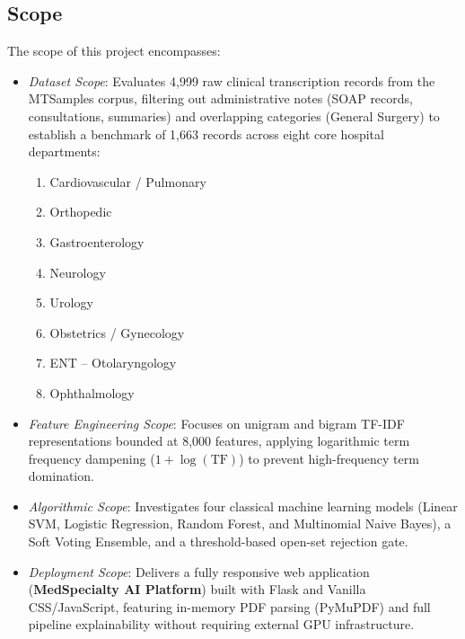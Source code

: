 \subsection{Scope}
The scope of this project encompasses:
\begin{itemize}
    \item \textit{Dataset Scope}: Evaluates 4,999 raw clinical transcription records from the MTSamples corpus, filtering out administrative notes (SOAP records, consultations, summaries) and overlapping categories (General Surgery) to establish a benchmark of 1,663 records across eight core hospital departments:
    \begin{enumerate}
        \item Cardiovascular / Pulmonary
        \item Orthopedic
        \item Gastroenterology
        \item Neurology
        \item Urology
        \item Obstetrics / Gynecology
        \item ENT -- Otolaryngology
        \item Ophthalmology
    \end{enumerate}
    \item \textit{Feature Engineering Scope}: Focuses on unigram and bigram TF-IDF representations bounded at 8,000 features, applying logarithmic term frequency dampening ($1 + \log(\text{TF})$) to prevent high-frequency term domination.
    \item \textit{Algorithmic Scope}: Investigates four classical machine learning models (Linear SVM, Logistic Regression, Random Forest, and Multinomial Naive Bayes), a Soft Voting Ensemble, and a threshold-based open-set rejection gate.
    \item \textit{Deployment Scope}: Delivers a fully responsive web application (\textbf{MedSpecialty AI Platform}) built with Flask and Vanilla CSS/JavaScript, featuring in-memory PDF parsing (PyMuPDF) and full pipeline explainability without requiring external GPU infrastructure.
\end{itemize}

